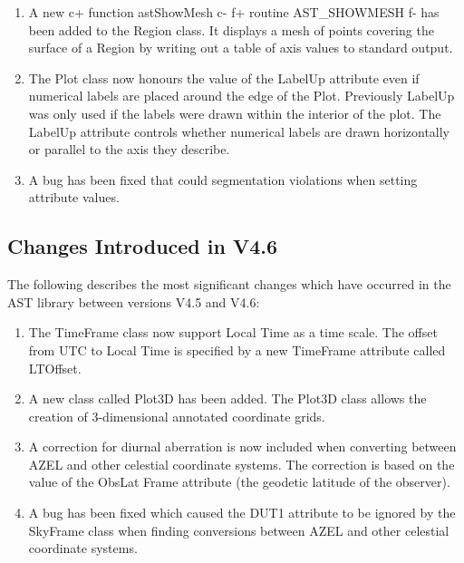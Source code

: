\documentclass[twoside,11pt]{article}
\begin{document}
\begin{enumerate}
\item A new
c+
function astShowMesh
c-
f+
routine AST\_SHOWMESH
f-
has been added to the Region class. It displays a mesh of points covering
the surface of a Region by writing out a table of axis values to standard
output.

\item The Plot class now honours the value of the LabelUp attribute even if
numerical labels are placed around the edge of the Plot. Previously
LabelUp was only used if the labels were drawn within the interior of
the plot. The LabelUp attribute controls whether numerical labels are
drawn horizontally or parallel to the axis they describe.

\item A bug has been fixed that could segmentation violations when setting
attribute values.

\end{enumerate}

\subsection{Changes Introduced in V4.6}

The following describes the most significant changes which have
occurred in the AST library between versions V4.5 and V4.6:

\begin{enumerate}

\item The TimeFrame class now support Local Time as a time scale. The offset
from UTC to Local Time is specified by a new TimeFrame attribute called
LTOffset.

\item A new class called Plot3D has been added. The Plot3D class allows
the creation of 3-dimensional annotated coordinate grids.

\item A correction for diurnal aberration is now included when
converting between AZEL and other celestial coordinate systems. The
correction is based on the value of the ObsLat Frame attribute (the
geodetic latitude of the observer).

\item A bug has been fixed which caused the DUT1 attribute to be ignored
by the SkyFrame class when finding conversions between AZEL and other
celestial coordinate systems.

\end{enumerate}
\end{document}
